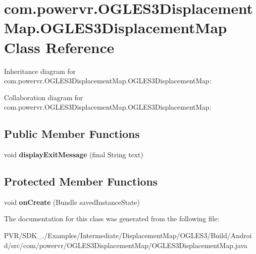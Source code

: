 \hypertarget{classcom_1_1powervr_1_1_o_g_l_e_s3_displacement_map_1_1_o_g_l_e_s3_displacement_map}{\section{com.\+powervr.\+O\+G\+L\+E\+S3\+Displacement\+Map.\+O\+G\+L\+E\+S3\+Displacement\+Map Class Reference}
\label{classcom_1_1powervr_1_1_o_g_l_e_s3_displacement_map_1_1_o_g_l_e_s3_displacement_map}
}


Inheritance diagram for com.\+powervr.\+O\+G\+L\+E\+S3\+Displacement\+Map.\+O\+G\+L\+E\+S3\+Displacement\+Map\+:


Collaboration diagram for com.\+powervr.\+O\+G\+L\+E\+S3\+Displacement\+Map.\+O\+G\+L\+E\+S3\+Displacement\+Map\+:
\subsection*{Public Member Functions}
\begin{DoxyCompactItemize}
\item 
\hypertarget{classcom_1_1powervr_1_1_o_g_l_e_s3_displacement_map_1_1_o_g_l_e_s3_displacement_map_aa2de1bdbea8c67eb6e0cb079826b5982}{void {\bfseries display\+Exit\+Message} (final String text)}\label{classcom_1_1powervr_1_1_o_g_l_e_s3_displacement_map_1_1_o_g_l_e_s3_displacement_map_aa2de1bdbea8c67eb6e0cb079826b5982}

\end{DoxyCompactItemize}
\subsection*{Protected Member Functions}
\begin{DoxyCompactItemize}
\item 
\hypertarget{classcom_1_1powervr_1_1_o_g_l_e_s3_displacement_map_1_1_o_g_l_e_s3_displacement_map_a01afa470b19dcdd4d09a83f42b766431}{void {\bfseries on\+Create} (Bundle saved\+Instance\+State)}\label{classcom_1_1powervr_1_1_o_g_l_e_s3_displacement_map_1_1_o_g_l_e_s3_displacement_map_a01afa470b19dcdd4d09a83f42b766431}

\end{DoxyCompactItemize}


The documentation for this class was generated from the following file\+:\begin{DoxyCompactItemize}
\item 
P\+V\+R/\+S\+D\+K\+\_./\+Examples/\+Intermediate/\+Displacement\+Map/\+O\+G\+L\+E\+S3/\+Build/\+Android/src/com/powervr/\+O\+G\+L\+E\+S3\+Displacement\+Map/O\+G\+L\+E\+S3\+Displacement\+Map.\+java\end{DoxyCompactItemize}
